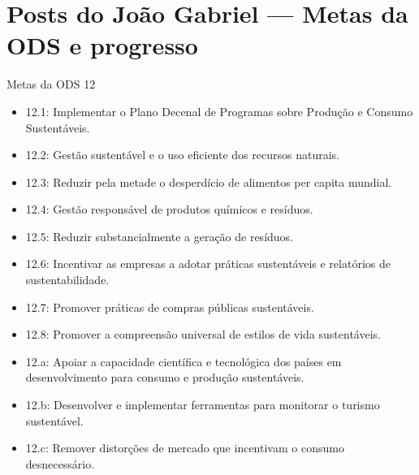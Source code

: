 \documentclass{beamer}
\begin{document}
	\section{Posts do João Gabriel --- Metas da ODS e progresso}

	\begin{frame}[allowframebreaks]{Metas da ODS 12}
		\begin{itemize}
			\item 12.1: Implementar o Plano Decenal de Programas sobre Produção e Consumo Sustentáveis.
			\item 12.2: Gestão sustentável e o uso eficiente dos recursos naturais.
			\item 12.3: Reduzir pela metade o desperdício de alimentos per capita mundial.
			\item 12.4: Gestão responsável de produtos químicos e resíduos.
			\item 12.5: Reduzir substancialmente a geração de resíduos.
			\item 12.6: Incentivar as empresas a adotar práticas sustentáveis e relatórios de sustentabilidade.
			\item 12.7: Promover práticas de compras públicas sustentáveis.
			\item 12.8: Promover a compreensão universal de estilos de vida sustentáveis.
			\item 12.a: Apoiar a capacidade científica e tecnológica dos países em desenvolvimento para consumo e produção sustentáveis.
			\item 12.b: Desenvolver e implementar ferramentas para monitorar o turismo sustentável.
			\item 12.c: Remover distorções de mercado que incentivam o consumo desnecessário.
		\end{itemize}
	\end{frame}
\end{document}
